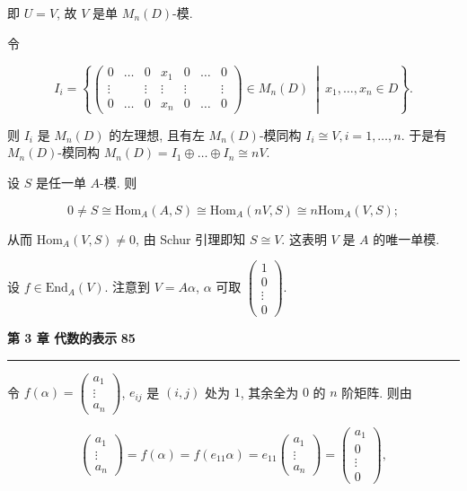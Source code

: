 \documentclass[11pt,a4paper]{article}
\begin{document}
即 $U = V$, 故 $V$ 是单 $M_n(D)$-模.

令

$$
I_i = \left\{ \begin{pmatrix}
0 & \dots & 0 & x_1 & 0 & \dots & 0 \\
\vdots & & \vdots & \vdots & \vdots & & \vdots \\
0 & \dots & 0 & x_n & 0 & \dots & 0
\end{pmatrix}
\in M_n(D) \ \middle| \ x_1, \dots, x_n \in D \right\}.
$$

则 $I_i$ 是 $M_n(D)$ 的左理想, 且有左 $M_n(D)$-模同构 $I_i \cong V, i = 1, \dots, n$. 于是有 $M_n(D)$-模同构 $M_n(D) = I_1 \oplus \dots \oplus I_n \cong nV$.

设 $S$ 是任一单 $A$-模. 则

$$
0 \neq S \cong \mathrm{Hom}_A(A, S) \cong \mathrm{Hom}_A(nV, S) \cong n\mathrm{Hom}_A(V, S);
$$

从而 $\mathrm{Hom}_A(V, S) \neq 0$, 由 Schur 引理即知 $S \cong V$. 这表明 $V$ 是 $A$ 的唯一单模.

设 $f \in \mathrm{End}_A(V)$. 注意到 $V = A\alpha$, $\alpha$ 可取 $\begin{pmatrix} 1 \\ 0 \\ \vdots \\ 0 \end{pmatrix}$.

\newpage
\noindent \textbf{第 3 章 \quad 代数的表示} \hfill \textbf{85}
\vspace{0.5em} \hrule \vspace{1.5em}

令 $f(\alpha) = \begin{pmatrix} a_1 \\ \vdots \\ a_n \end{pmatrix}$, $e_{ij}$ 是 $(i, j)$ 处为 $1$, 其余全为 $0$ 的 $n$ 阶矩阵. 则由

$$
\begin{pmatrix} a_1 \\ \vdots \\ a_n \end{pmatrix}
= f(\alpha) = f(e_{11}\alpha) = e_{11} \begin{pmatrix} a_1 \\ \vdots \\ a_n \end{pmatrix}
= \begin{pmatrix} a_1 \\ 0 \\ \vdots \\ 0 \end{pmatrix},
$$
\end{document}
